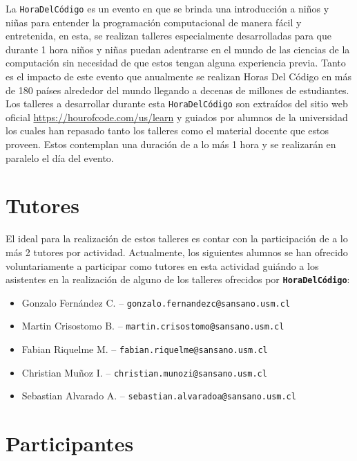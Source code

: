\documentclass[letterpaper,12pt]{article}
\begin{document}
La \texttt{HoraDelCódigo} es un evento en que se brinda una introducción a niños y niñas para entender la programación computacional de manera fácil y entretenida, en esta, se realizan talleres especialmente desarrolladas para que durante 1 hora niños y niñas puedan adentrarse en el mundo de las ciencias de la computación sin necesidad de que estos tengan alguna experiencia previa. Tanto es el impacto de este evento que anualmente se realizan Horas Del Código en más de 180 países alrededor del mundo llegando a decenas de millones de estudiantes.\\

Los talleres a desarrollar durante esta \texttt{HoraDelCódigo} son extraídos del sitio web oficial \href{https://hourofcode.com/us/learn}{https://hourofcode.com/us/learn} y guiados por alumnos de la universidad los cuales han repasado tanto los talleres como el material docente que estos proveen. Estos contemplan una duración de a lo más 1 hora y se realizarán en paralelo el día del evento.

\vfill

\section{Tutores}

El ideal para la realización de estos talleres es contar con la participación de a lo más 2 tutores por actividad. Actualmente, los siguientes alumnos se han ofrecido voluntariamente a participar como tutores en esta actividad guiándo a los asistentes en la realización de alguno de los talleres ofrecidos por \texttt{\textbf{HoraDelCódigo}}:

\begin{itemize}
    \item Gonzalo Fernández C. -- \texttt{gonzalo.fernandezc@sansano.usm.cl} 
    \item Martin Crisostomo B. -- \texttt{martin.crisostomo@sansano.usm.cl} 
    \item Fabian Riquelme M. -- \texttt{fabian.riquelme@sansano.usm.cl}
    \item Christian Muñoz I. -- \texttt{christian.munozi@sansano.usm.cl}
    \item Sebastian Alvarado A. -- \texttt{sebastian.alvaradoa@sansano.usm.cl}
\end{itemize}

\section{Participantes}
\end{document}
